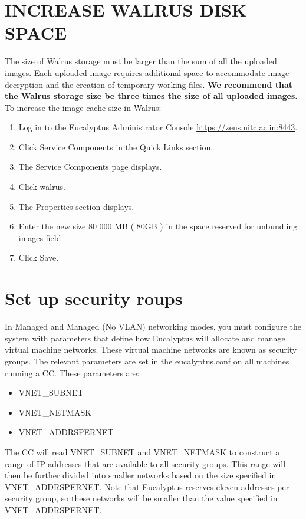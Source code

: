 \section{INCREASE WALRUS DISK SPACE}
The size of Walrus storage must be larger than the sum of all the uploaded images. Each uploaded image requires additional space to accommodate image decryption and the creation of temporary working files. \textbf{We recommend that the Walrus storage size be three times the size of all uploaded images.}
To increase the image cache size in Walrus:
\begin{enumerate}
\item Log in to the Eucalyptus Administrator Console \url{https://zeus.nitc.ac.in:8443}.
\item Click Service Components in the Quick Links section.
\item The Service Components page displays.
\item Click walrus.
\item The Properties section displays.
\item Enter the new size 80 000 MB ( 80GB ) in the space reserved for unbundling images field.
\item Click Save.

\end{enumerate}

\section{Set up security roups}

In Managed and Managed (No VLAN) networking modes, you must configure the system with parameters that define how Eucalyptus will allocate and manage virtual machine networks. These virtual machine networks are known as security groups. The relevant parameters are set in the eucalyptus.conf on all machines running a CC. These parameters are:
\begin{itemize}
\item VNET\_SUBNET
\item VNET\_NETMASK
\item VNET\_ADDRSPERNET
\end{itemize}
The CC will read VNET\_SUBNET and VNET\_NETMASK to construct a range of IP addresses that are available to all security groups. This range will then be further divided into smaller networks based on the size specified in VNET\_ADDRSPERNET. Note that Eucalyptus reserves eleven addresses per security group, so these networks will be smaller than the value specified in VNET\_ADDRSPERNET.

